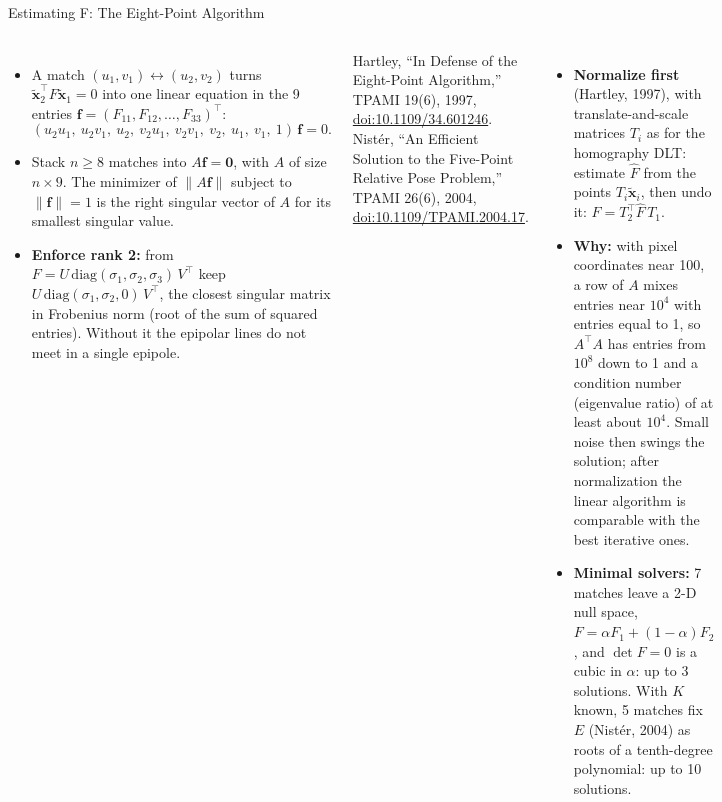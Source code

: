 \begin{frame}{Estimating F: The Eight-Point Algorithm}
  \begin{columns}[T,onlytextwidth]
      \begin{itemize}\footnotesize\itemsep0.3em
        \item A match $(u_1,v_1)\leftrightarrow(u_2,v_2)$ turns $\tilde{\mathbf{x}}_2^\top F\tilde{\mathbf{x}}_1=0$ into one linear equation in the 9 entries $\mathbf{f}=(F_{11},F_{12},\dots,F_{33})^\top$:
        \[ (u_2u_1,\ u_2v_1,\ u_2,\ v_2u_1,\ v_2v_1,\ v_2,\ u_1,\ v_1,\ 1)\,\mathbf{f}=0. \]
        \item Stack $n\geq8$ matches into $A\mathbf{f}=\mathbf{0}$, with $A$ of size $n\times9$. The minimizer of $\lVert A\mathbf{f}\rVert$ subject to $\lVert\mathbf{f}\rVert=1$ is the right singular vector of $A$ for its smallest singular value.
        \item \textbf{Enforce rank 2:} from $F=U\,\mathrm{diag}(\sigma_1,\sigma_2,\sigma_3)\,V^\top$ keep $U\,\mathrm{diag}(\sigma_1,\sigma_2,0)\,V^\top$, the closest singular matrix in Frobenius norm (root of the sum of squared entries). Without it the epipolar lines do not meet in a single epipole.
      \end{itemize}
      \vspace{0.3em}
      {\scriptsize Hartley, ``In Defense of the Eight-Point Algorithm,'' TPAMI 19(6), 1997, \href{https://doi.org/10.1109/34.601246}{doi:10.1109/34.601246}. Nist\'er, ``An Efficient Solution to the Five-Point Relative Pose Problem,'' TPAMI 26(6), 2004, \href{https://doi.org/10.1109/TPAMI.2004.17}{doi:10.1109/TPAMI.2004.17}.\par}
      \begin{itemize}\footnotesize\itemsep0.3em
        \item \textbf{Normalize first} (Hartley, 1997), with translate-and-scale matrices $T_i$ as for the homography DLT: estimate $\hat{F}$ from the points $T_i\tilde{\mathbf{x}}_i$, then undo it: $F=T_2^\top\hat{F}\,T_1$.
        \item \textbf{Why:} with pixel coordinates near 100, a row of $A$ mixes entries near $10^4$ with entries equal to 1, so $A^\top A$ has entries from $10^8$ down to 1 and a condition number (eigenvalue ratio) of at least about $10^4$. Small noise then swings the solution; after normalization the linear algorithm is comparable with the best iterative ones.
        \item \textbf{Minimal solvers:} 7 matches leave a 2-D null space, $F=\alpha F_1+(1-\alpha)F_2$, and $\det F=0$ is a cubic in $\alpha$: up to 3 solutions. With $K$ known, 5 matches fix $E$ (Nist\'er, 2004) as roots of a tenth-degree polynomial: up to 10 solutions.
      \end{itemize}
  \end{columns}
\end{frame}

